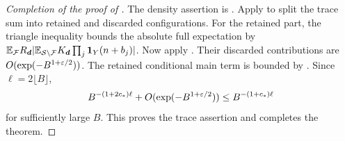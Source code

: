 \begin{proof}[Completion of the proof of ]
The density assertion is .  Apply
 to split the trace sum into retained and
discarded configurations.  For the retained part, the triangle
inequality bounds the absolute full expectation by
$\mathbb E_{\mathcal F}R_{\boldsymbol d}
 |\mathbb E_{\mathcal S\setminus\mathcal F}
 K_{\boldsymbol d}\prod_j\mathbf 1_Y(n+b_j)|$.
Now apply .  Their discarded
contributions are $O(\exp(-B^{1+\varepsilon/2}))$.  The retained conditional
main term is bounded by .  Since
$\ell=2\lfloor B\rfloor$,
\[
 B^{-(1+2c_*)\ell}+O(\exp(-B^{1+\varepsilon/2}))
 \le B^{-(1+c_*)\ell}
\]
for sufficiently large $B$.  This proves the trace assertion and
completes the theorem.
\end{proof}

